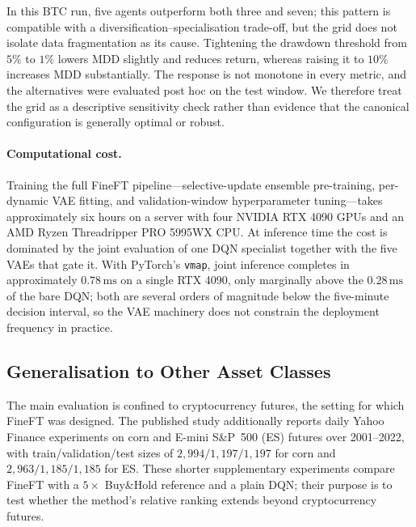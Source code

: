 In this BTC run, five agents outperform both three and seven; this pattern is compatible with a diversification--specialisation trade-off, but the grid does not isolate data fragmentation as its cause. Tightening the drawdown threshold from $5\%$ to $1\%$ lowers MDD slightly and reduces return, whereas raising it to $10\%$ increases MDD substantially. The response is not monotone in every metric, and the alternatives were evaluated post hoc on the test window. We therefore treat the grid as a descriptive sensitivity check rather than evidence that the canonical configuration is generally optimal or robust.

\paragraph{Computational cost.} Training the full FineFT pipeline---selective-update ensemble pre-training, per-dynamic VAE fitting, and validation-window hyperparameter tuning---takes approximately six hours on a server with four NVIDIA RTX 4090 GPUs and an AMD Ryzen Threadripper PRO 5995WX CPU. At inference time the cost is dominated by the joint evaluation of one DQN specialist together with the five VAEs that gate it. With PyTorch's \texttt{vmap}, joint inference completes in approximately $0.78\,\mathrm{ms}$ on a single RTX 4090, only marginally above the $0.28\,\mathrm{ms}$ of the bare DQN; both are several orders of magnitude below the five-minute decision interval, so the VAE machinery does not constrain the deployment frequency in practice.

\subsection{Generalisation to Other Asset Classes}
\label{sec:fineft_generalisation}

The main evaluation is confined to cryptocurrency futures, the setting for which FineFT was designed. The published study additionally reports daily Yahoo Finance experiments on corn and E-mini S\&P~500 (ES) futures over 2001--2022, with train/validation/test sizes of $2{,}994/1{,}197/1{,}197$ for corn and $2{,}963/1{,}185/1{,}185$ for ES. These shorter supplementary experiments compare FineFT with a $5\times$ Buy\&Hold reference and a plain DQN; their purpose is to test whether the method's relative ranking extends beyond cryptocurrency futures.

